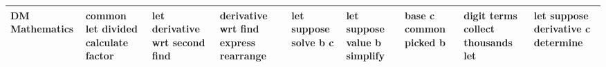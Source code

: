 \documentclass[11pt,a4paper]{article}
\begin{document}
\begin{appendices}
\begin{table*}[htb]
\begin{tiny}
\begin{tabular}{|p{}|p{}|p{}|p{}|p{}|p{}|p{}|p{}|p{}|}
    DM Mathematics & common \newline let \newline divided \newline calculate \newline factor & let \newline derivative \newline wrt \newline second \newline find & derivative \newline wrt \newline find \newline express \newline rearrange & let \newline suppose \newline solve \newline b \newline c & let \newline suppose \newline value \newline b \newline simplify & base \newline c \newline common \newline picked \newline b & digit \newline terms \newline collect \newline thousands \newline let & let \newline suppose \newline derivative \newline c \newline determine\\\hline

\end{tabular}
\end{tiny}
\end{table*}
\end{appendices}
\end{document}
